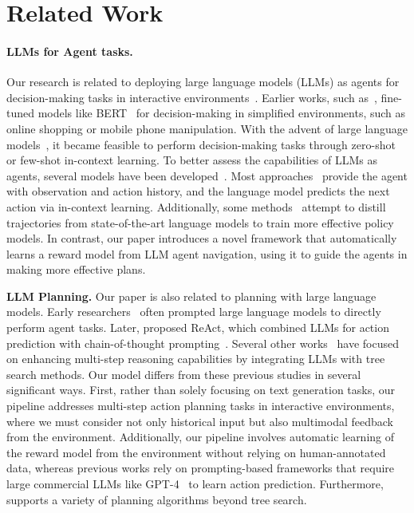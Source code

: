 \section{Related Work}

\paragraph{LLMs for Agent tasks.}

Our research is related to deploying large language models (LLMs) as agents for decision-making tasks in interactive environments~\citep{liu2023agentbench,zhou2023webarena,shridhar2020alfred,toyama2021androidenv}. Earlier works, such as~\citep{yao2023webshopscalablerealworldweb}, fine-tuned models like BERT~\citep{devlin2019bertpretrainingdeepbidirectional} for decision-making in simplified environments, such as online shopping or mobile phone manipulation. With the advent of large language models~\citep{brown2020languagemodelsfewshotlearners,openai2024gpt4technicalreport}, it became feasible to perform decision-making tasks through zero-shot or few-shot in-context learning. To better assess the capabilities of LLMs as agents, several models have been developed~\citep{deng2024mind2web,xiong2024watch,hong2023cogagent,yan2023gpt}. Most approaches~\citep{zheng2024seeact,deng2024mind2web} provide the agent with observation and action history, and the language model predicts the next action via in-context learning. Additionally, some methods~\citep{zhang2023building,li2023camel,song2024trial} attempt to distill trajectories from state-of-the-art language models to train more effective policy models. In contrast, our paper introduces a novel framework that automatically learns a reward model from LLM agent navigation, using it to guide the agents in making more effective plans.

\textbf{LLM Planning.} Our paper is also related to planning with large language models. Early researchers~\citep{brown2020languagemodelsfewshotlearners} often prompted large language models to directly perform agent tasks. Later, \citet{yao2022react} proposed ReAct, which combined LLMs for action prediction with chain-of-thought prompting~\citep{wei2022chain}. Several other works~\citep{yao2023treethoughtsdeliberateproblem,hao2023reasoning,zhao2023large,qiao2024agentplanningworldknowledge} have focused on enhancing multi-step reasoning capabilities by integrating LLMs with tree search methods. Our model differs from these previous studies in several significant ways. First, rather than solely focusing on text generation tasks, our pipeline addresses multi-step action planning tasks in interactive environments, where we must consider not only historical input but also multimodal feedback from the environment. Additionally, our pipeline involves automatic learning of the reward model from the environment without relying on human-annotated data, whereas previous works rely on prompting-based frameworks that require large commercial LLMs like GPT-4~\citep{openai2024gpt4technicalreport} to learn action prediction. Furthermore, \Model supports a variety of planning algorithms beyond tree search.

